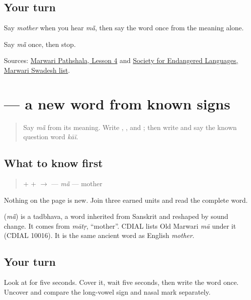 \subsection*{Your turn}
Say \emph{mother} when you hear \emph{mā̃}, then say the word once from the meaning alone.

\begin{tcolorbox}[breakable,colback=teal!4,colframe=teal!35!black,title={Before you move on}]
Say \emph{mā̃} once, then stop.

Sources: \href{https://www.marwaripathshala.com/marwari-lesson-4-english}{Marwari Pathshala, Lesson 4} and \href{https://selindia.org/wp-content/uploads/2025/05/SWL-Marwari\_IPA.pdf}{Society for Endangered Languages, Marwari Swadesh list}.
\end{tcolorbox}
\section[\texorpdfstring{\mw{मां} (mā̃)}{मां (mā̃)}]{ — a new word from known signs}

\label{lesson:MW-C08-maa}



\begin{quote}
Say \emph{mā̃} from its meaning. Write \textbf{}, \textbf{}, and \textbf{}; then write \textbf{} and say the known question word \emph{kāĩ}.
\end{quote}

\subsection*{What to know first}
\begin{quote}
\textbf{} + \textbf{} + \textbf{} $\to$ \textbf{} — \emph{mā̃} — mother
\end{quote}

Nothing on the page is new. Join three earned units and read the complete word.

\begin{cousinweb}
\textbf{} (\emph{mā̃}) is a tadbhava, a word inherited from Sanskrit and reshaped by sound change. It comes from \emph{mātṛ}, \textquotedblleft{}mother\textquotedblright{}. CDIAL lists Old Marwari \emph{mā} under it (CDIAL 10016). It is the same ancient word as English \emph{mother}.
\end{cousinweb}

\subsection*{Your turn}
Look at \textbf{} for five seconds. Cover it, wait five seconds, then write the word once. Uncover and compare the long-vowel sign and nasal mark separately.

